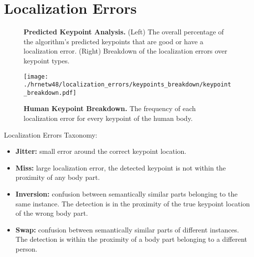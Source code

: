 \documentclass[10pt,onecolumn,letterpaper]{article}
\begin{document}
\clearpage

\section{Localization Errors}

\begin{figure}[h!]
\centering
{}
\caption{ {\small \textbf{Predicted Keypoint Analysis.}
(Left) The overall percentage of the algorithm's predicted keypoints that are good or have a localization error.
(Right) Breakdown of the localization errors over keypoint types.}}
\end{figure}

\begin{wrapfigure}{l}{0.5\textwidth}
\texttt{[image: ./hrnetw48/localization\_errors/keypoints\_breakdown/keypoint\_breakdown.pdf]}
\caption{ {\small \textbf{Human Keypoint Breakdown.} The frequency of each localization error for every keypoint of the human body.}}
\end{wrapfigure}

Localization Errors Taxonomy:
\begin{itemize}
\item \textbf{Jitter:} small error around the correct keypoint location.

\item \textbf{Miss:} large localization error, the detected keypoint is not within the proximity of any body part.

\item \textbf{Inversion:} confusion between semantically similar parts belonging to the same instance. The detection is in the proximity of the true keypoint location of the wrong body part.

\item \textbf{Swap:} confusion between semantically similar parts of different instances. The detection is within the proximity of a body part belonging to a different person.

\end{itemize}
\end{document}
